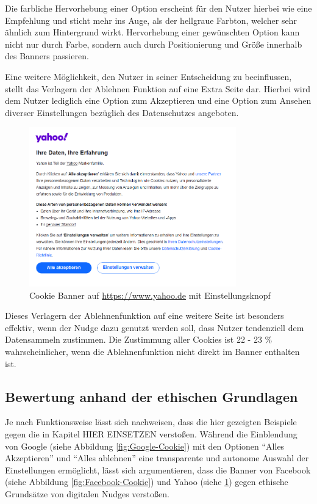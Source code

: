 Die farbliche Hervorhebung einer Option erscheint für den Nutzer hierbei wie eine Empfehlung und sticht mehr ins Auge, als der hellgraue Farbton, welcher sehr ähnlich zum Hintergrund wirkt. Hervorhebung einer gewünschten Option kann nicht nur durch Farbe, sondern auch durch Positionierung und Größe innerhalb des Banners passieren.

Eine weitere Möglichkeit, den Nutzer in seiner Entscheidung zu beeinflussen, stellt das Verlagern der Ablehnen Funktion auf eine Extra Seite dar. Hierbei wird dem Nutzer lediglich eine Option zum Akzeptieren und eine Option zum Ansehen diverser Einstellungen bezüglich des Datenschutzes angeboten.

\begin{figure}[ht]
    \centering
    \includegraphics[width=0.8\textwidth]{Bilder/Yahoo_Banner.png}
    \caption{Cookie Banner auf \url{https://www.yahoo.de} mit Einstellungsknopf}
    \label{fig:Yahoo-Cookie}
\end{figure}

Dieses Verlagern der Ablehnenfunktion auf eine weitere Seite ist besonders effektiv, wenn der Nudge dazu genutzt werden soll, dass Nutzer tendenziell dem Datensammeln zustimmen. Die Zustimmung aller Cookies ist 22 - 23 \% wahrscheinlicher, wenn die Ablehnenfunktion nicht direkt im Banner enthalten ist. \parencite[S. 8]{Nouwens.2020}

\subsection{Bewertung anhand der ethischen Grundlagen}

Je nach Funktionsweise lässt sich nachweisen, dass die hier gezeigten Beispiele gegen die in Kapitel HIER EINSETZEN verstoßen.
Während die Einblendung von Google (siehe Abbildung \ref{fig:Google-Cookie}) mit den Optionen ``Alles Akzeptieren'' und ``Alles ablehnen'' eine transparente und autonome Auswahl der Einstellungen ermöglicht, lässt sich argumentieren, dass die Banner von Facebook (siehe Abbildung \ref{fig:Facebook-Cookie}) und Yahoo (siehe \ref{fig:Yahoo-Cookie}) gegen ethische Grundsätze von digitalen Nudges verstoßen.

